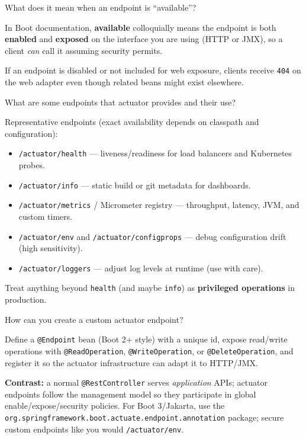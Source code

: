 \question[4]
What does it mean when an endpoint is ``available''?
\begin{solutionorbox}[1.1in]
  In Boot documentation, \textbf{available} colloquially means the endpoint is both \textbf{enabled} and \textbf{exposed} on the interface you are using (HTTP or JMX), so a client \emph{can} call it assuming security permits.

  If an endpoint is disabled or not included for web exposure, clients receive \texttt{404} on the web adapter even though related beans might exist elsewhere.
\end{solutionorbox}

\question[4]
What are some endpoints that actuator provides and their use?
\begin{solutionorbox}[1.45in]
  Representative endpoints (exact availability depends on classpath and configuration):
  \begin{itemize}
    \item \texttt{/actuator/health} --- liveness/readiness for load balancers and Kubernetes probes.
    \item \texttt{/actuator/info} --- static build or git metadata for dashboards.
    \item \texttt{/actuator/metrics} / Micrometer registry --- throughput, latency, JVM, and custom timers.
    \item \texttt{/actuator/env} and \texttt{/actuator/configprops} --- debug configuration drift (high sensitivity).
    \item \texttt{/actuator/loggers} --- adjust log levels at runtime (use with care).
  \end{itemize}
  Treat anything beyond \texttt{health} (and maybe \texttt{info}) as \textbf{privileged operations} in production.
\end{solutionorbox}

\question[4]
How can you create a custom actuator endpoint?
\begin{solutionorbox}[1.25in]
  Define a \texttt{@Endpoint} bean (Boot 2+ style) with a unique id, expose read/write operations with \texttt{@ReadOperation}, \texttt{@WriteOperation}, or \texttt{@DeleteOperation}, and register it so the actuator infrastructure can adapt it to HTTP/JMX.

  \noindent\textbf{Contrast:} a normal \texttt{@RestController} serves \emph{application} APIs; actuator endpoints follow the management model so they participate in global enable/expose/security policies. For Boot 3/Jakarta, use the \texttt{org.springframework.boot.actuate.endpoint.annotation} package; secure custom endpoints like you would \texttt{/actuator/env}.
\end{solutionorbox}


